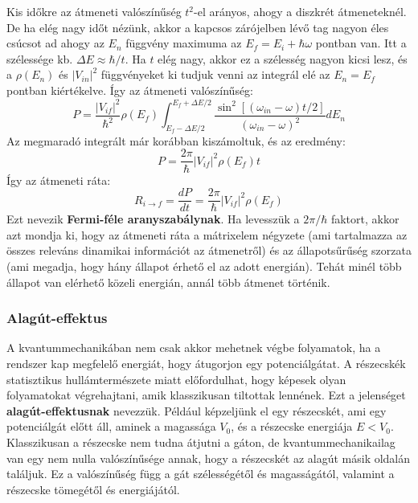 \documentclass[../main.tex]{subfiles}
\begin{document}
Kis időkre az átmeneti valószínűség $t^2$-el arányos, ahogy a diszkrét átmeneteknél. De ha elég nagy időt nézünk, akkor a kapcsos zárójelben lévő tag nagyon éles csúcsot ad ahogy az $E_n$ függvény maximuma az $E_f = E_i + \hbar \omega$ pontban van.
Itt a szélessége kb. $\Delta E \approx \hbar / t$. Ha $t$ elég nagy, akkor ez a szélesség nagyon kicsi lesz, és a $\rho(E_n)$ és $|V_{in}|^2$ függvényeket ki tudjuk venni az integrál elé az $E_n = E_f$ pontban kiértékelve. Így az átmeneti valószínűség:
\begin{equation}
    P = \frac{|V_{if}|^2}{\hbar^2} \rho(E_f) \int_{E_f - \Delta E/2}^{E_f + \Delta E/2} \frac{\sin^2[(\omega_{in} - \omega)t/2]}{(\omega_{in} - \omega)^2} dE_n
\end{equation}
Az megmaradó integrált már korábban kiszámoltuk, és az eredmény:
\begin{equation}
    P = \frac{2 \pi}{\hbar} |V_{if}|^2 \rho(E_f) t
\end{equation}
Így az átmeneti ráta:
\begin{equation}
    \boxed{R_{i \to f} = \frac{dP}{dt} = \frac{2 \pi}{\hbar} |V_{if}|^2 \rho(E_f)}
\end{equation}
Ezt nevezik \textbf{Fermi-féle aranyszabálynak}. Ha levesszük a $2\pi/\hbar$ faktort, akkor azt mondja ki, hogy az átmeneti ráta a mátrixelem négyzete (ami tartalmazza az összes releváns dinamikai információt az átmenetről) és az állapotsűrűség szorzata (ami megadja, hogy hány állapot érhető el az adott energián).
Tehát minél több állapot van elérhető közeli energián, annál több átmenet történik. 

\subsubsection{Alagút-effektus}
A kvantummechanikában nem csak akkor mehetnek végbe folyamatok, ha a rendszer kap megfelelő energiát, hogy átugorjon egy potenciálgátat. A részecskék statisztikus hullámtermészete miatt előfordulhat, 
hogy képesek olyan folyamatokat végrehajtani, amik klasszikusan tiltottak lennének. Ezt a jelenséget \textbf{alagút-effektusnak} nevezzük. Például képzeljünk el egy részecskét, ami egy potenciálgát
előtt áll, aminek a magassága $V_0$, és a részecske energiája $E < V_0$. Klasszikusan a részecske nem tudna átjutni a gáton, de kvantummechanikailag van egy nem nulla valószínűsége annak, hogy a részecskét
az alagút másik oldalán találjuk. Ez a valószínűség függ a gát szélességétől és magasságától, valamint a részecske tömegétől és energiájától.
\end{document}
